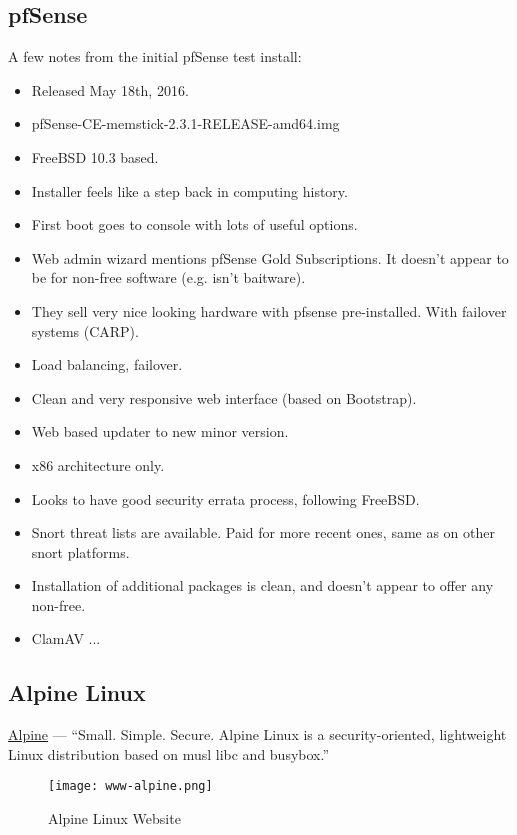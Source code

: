 \subsection{pfSense}

A few notes from the initial pfSense test install:

\begin{itemize}
 \item Released May 18th, 2016.
 \item pfSense-CE-memstick-2.3.1-RELEASE-amd64.img
 \item FreeBSD 10.3 based.
 \item Installer feels like a step back in computing history.
 \item First boot goes to console with lots of useful options.
 \item Web admin wizard mentions pfSense Gold Subscriptions. It doesn't appear to be for non-free software (e.g. isn't baitware).
 \item They sell very nice looking hardware with pfsense pre-installed. With failover systems (CARP).
 \item Load balancing, failover.
 \item Clean and very responsive web interface (based on Bootstrap).
 \item Web based updater to new minor version.
 \item x86 architecture only.
 \item Looks to have good security errata process, following FreeBSD.
 \item Snort threat lists are available. Paid for more recent ones, same as on other snort platforms.
 \item Installation of additional packages is clean, and doesn't appear to offer any non-free.
 \item ClamAV ...
\end{itemize}


\subsection{Alpine Linux}
 \href{https://www.alpinelinux.org/}{Alpine} --- ``Small. Simple. Secure. Alpine Linux is a security-oriented, lightweight Linux distribution based on musl libc and busybox.''

\begin{figure}[h!]
\texttt{[image: www-alpine.png]}
 \caption{Alpine Linux Website}
 \label{fig:www-alpine}
\end{figure}

